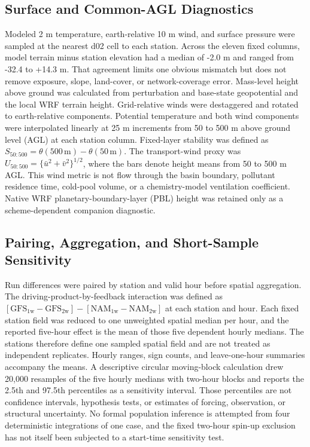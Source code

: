 \documentclass[air,article,submit,moreauthors]{Definitions/mdpi}
\begin{document}
\subsection{Surface and Common-AGL Diagnostics}

Modeled 2 m temperature, earth-relative 10 m wind, and surface pressure were sampled at the nearest d02 cell to each station.
Across the eleven fixed columns, model terrain minus station elevation had a median of -2.0 m and ranged from -32.4 to +14.3 m.
That agreement limits one obvious mismatch but does not remove exposure, slope, land-cover, or network-coverage error.
Mass-level height above ground was calculated from perturbation and base-state geopotential and the local WRF terrain height.
Grid-relative winds were destaggered and rotated to earth-relative components.
Potential temperature and both wind components were interpolated linearly at 25 m increments from 50 to 500 m above ground level (AGL) at each station column.
Fixed-layer stability was defined as $S_{50:500}=\theta(500\,\mathrm{m})-\theta(50\,\mathrm{m})$.
The transport-wind proxy was $U_{50:500}=\{\bar{u}^{2}+\bar{v}^{2}\}^{1/2}$, where the bars denote height means from 50 to 500 m AGL.
This wind metric is not flow through the basin boundary, pollutant residence time, cold-pool volume, or a chemistry-model ventilation coefficient.
Native WRF planetary-boundary-layer (PBL) height was retained only as a scheme-dependent companion diagnostic.

\subsection{Pairing, Aggregation, and Short-Sample Sensitivity}

Run differences were paired by station and valid hour before spatial aggregation.
The driving-product-by-feedback interaction was defined as $[\mathrm{GFS}_{1\mathrm{w}}-\mathrm{GFS}_{2\mathrm{w}}]-[\mathrm{NAM}_{1\mathrm{w}}-\mathrm{NAM}_{2\mathrm{w}}]$ at each station and hour.
Each fixed station field was reduced to one unweighted spatial median per hour, and the reported five-hour effect is the mean of those five dependent hourly medians.
The stations therefore define one sampled spatial field and are not treated as independent replicates.
Hourly ranges, sign counts, and leave-one-hour summaries accompany the means.
A descriptive circular moving-block calculation drew 20,000 resamples of the five hourly medians with two-hour blocks and reports the 2.5th and 97.5th percentiles as a sensitivity interval.
Those percentiles are not confidence intervals, hypothesis tests, or estimates of forcing, observation, or structural uncertainty.
No formal population inference is attempted from four deterministic integrations of one case, and the fixed two-hour spin-up exclusion has not itself been subjected to a start-time sensitivity test.
\end{document}
